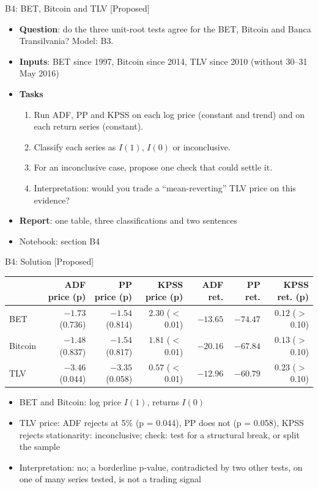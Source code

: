 \begin{frame}{B4: BET, Bitcoin and TLV [Proposed]}
\itemsize{\footnotesize}
\begin{itemize}
\item \textbf{Question}: do the three unit-root tests agree for the BET, Bitcoin and Banca Transilvania? Model: B3.
\item \textbf{Inputs}: BET since 1997, Bitcoin since 2014, TLV since 2010 (without 30--31 May 2016)
\item \textbf{Tasks}
\begin{enumerate}
    \item Run ADF, PP and KPSS on each log price (constant and trend) and on each return series (constant).
    \item Classify each series as $I(1)$, $I(0)$ or inconclusive.
    \item For an inconclusive case, propose one check that could settle it.
    \item Interpretation: would you trade a ``mean-reverting'' TLV price on this evidence?
\end{enumerate}
\item \textbf{Report}: one table, three classifications and two sentences
\item Notebook: section B4
\end{itemize}
\end{frame}

\ifsolutions
\begin{frame}{B4: Solution [Proposed]}
\itemsize{\footnotesize}
\begin{center}
\scriptsize
\begin{tabular}{lrrrrrr}
\toprule
& ADF price (p) & PP price (p) & KPSS price (p) & ADF ret. & PP ret. & KPSS ret. (p) \\
\midrule
BET & ${-1.73}$ (0.736) & ${-1.54}$ (0.814) & $2.30$ ($<$\,0.01) & ${-13.65}$ & ${-74.47}$ & $0.12$ ($>$\,0.10) \\
Bitcoin & ${-1.48}$ (0.837) & ${-1.54}$ (0.817) & $1.81$ ($<$\,0.01) & ${-20.16}$ & ${-67.84}$ & $0.13$ ($>$\,0.10) \\
TLV & ${-3.46}$ (0.044) & ${-3.35}$ (0.058) & $0.57$ ($<$\,0.01) & ${-12.96}$ & ${-60.79}$ & $0.23$ ($>$\,0.10) \\
\bottomrule
\end{tabular}
\end{center}
\begin{itemize}
    \item BET and Bitcoin: log price $I(1)$, returns $I(0)$
    \item TLV price: ADF rejects at 5\% (p = 0.044), PP does not (p = 0.058), KPSS rejects stationarity: inconclusive; check: test for a structural break, or split the sample
    \item Interpretation: no; a borderline p-value, contradicted by two other tests, on one of many series tested, is not a trading signal
\end{itemize}
\end{frame}
\fi


